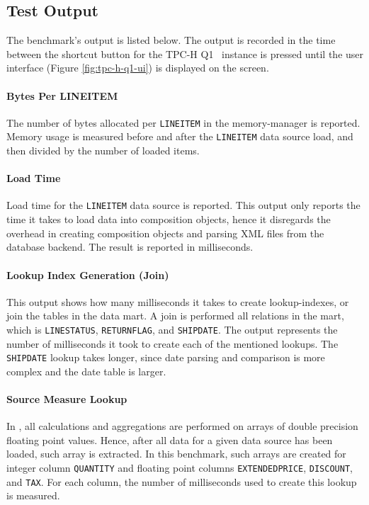 \subsection{Test Output}
\label{sub:Test Output}
The benchmark's output is listed below. The output is recorded in the time between the shortcut button for the TPC-H Q1 \gd~instance is pressed until the user interface (Figure \ref{fig:tpc-h-q1-ui}) is displayed on the screen.

\paragraph{Bytes Per LINEITEM}
The number of bytes allocated per \texttt{LINEITEM} in the memory-manager is reported. Memory usage is measured before and after the \texttt{LINEITEM} data source load, and then divided by the number of loaded items.

\paragraph{Load Time}
\label{par:Load Time}
Load time for the \texttt{LINEITEM} data source is reported. This output only reports the time it takes to load data into composition objects, hence it disregards the overhead in creating composition objects and parsing XML files from the database backend. The result is reported in milliseconds.

\paragraph{Lookup Index Generation (Join)}
This output shows how many milliseconds it takes to create lookup-indexes, or join the tables in the data mart. A join is performed all relations in the mart, which is \texttt{LINESTATUS}, \texttt{RETURNFLAG}, and \texttt{SHIPDATE}. The output represents the number of milliseconds it took to create each of the mentioned lookups. The \texttt{SHIPDATE} lookup takes longer, since date parsing and comparison is more complex and the date table is larger.

\paragraph{Source Measure Lookup}
In \gd, all calculations and aggregations are performed on arrays of double precision floating point values. Hence, after all data for a given data source has been loaded, such array is extracted. In this benchmark, such arrays are created for integer column \texttt{QUANTITY} and floating point columns \texttt{EXTENDEDPRICE}, \texttt{DISCOUNT}, and \texttt{TAX}. For each column, the number of milliseconds used to create this lookup is measured.

